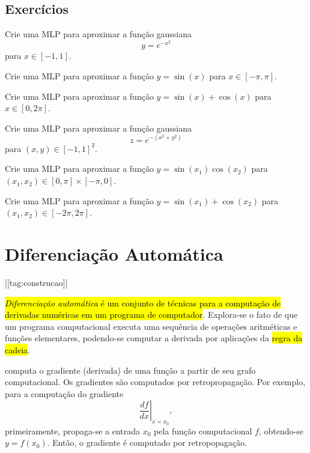 \subsection{Exercícios}

\begin{exer}
  Crie uma MLP para aproximar a função gaussiana
  \begin{equation}
    y = e^{-x^2}
  \end{equation}
  para $x\in [-1, 1]$.
\end{exer}

\begin{exer}
  Crie uma MLP para aproximar a função $y = \sin(x)$ para $x\in [-\pi, \pi]$.
\end{exer}

\begin{exer}
  Crie uma MLP para aproximar a função $y = \sin(x) + \cos(x)$ para $x\in [0, 2\pi]$.
\end{exer}

\begin{exer}
  Crie uma MLP para aproximar a função gaussiana
  \begin{equation}
    z = e^{-(x^2 + y^2)}
  \end{equation}
  para $(x, y) \in [-1, 1]^2$.
\end{exer}

\begin{exer}
  Crie uma MLP para aproximar a função $y = \sin(x_1)\cos(x_2)$ para $(x_1, x_2)\in [0, \pi]\times [-\pi, 0]$.
\end{exer}

\begin{exer}
  Crie uma MLP para aproximar a função $y = \sin(x_1) + \cos(x_2)$ para $(x_1, x_2)\in [-2\pi, 2\pi]$.
\end{exer}

\section{Diferenciação Automática}\label{cap_mlp_sec_autograd}

[[tag:construcao]]

\hl{\emph{Diferenciação automática} é um conjunto de técnicas para a computação de derivadas numéricas em um programa de computador}. Explora-se o fato de que um programa computacional executa uma sequência de operações aritméticas e funções elementares, podendo-se computar a derivada por aplicações da \hl{regra da cadeia}.

{\pytorch} computa o gradiente (derivada) de uma função a partir de seu grafo computacional. Os gradientes são computados por retropropagação. Por exemplo, para a computação do gradiente
\begin{equation}
  \left.\frac{d f}{d x}\right|_{x = x_0},
\end{equation}
primeiramente, propaga-se a entrada $x_0$ pela função computacional $f$, obtendo-se $y = f(x_0)$. Então, o gradiente é computado por retropopagação.

